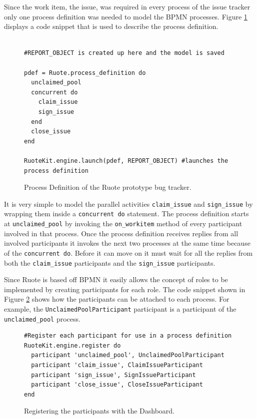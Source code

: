 \documentclass[document.tex]{subfiles}
\begin{document}
Since the work item, the issue, was required in every process of the issue tracker only one process definition was needed to model the BPMN processes. Figure \ref{fig:ruote-prototype-process-definition} displays a code snippet that is used to describe the process definition. 

\begin{figure}[!ht]
  \begin{lstlisting}

#REPORT_OBJECT is created up here and the model is saved

pdef = Ruote.process_definition do
  unclaimed_pool
  concurrent do
    claim_issue
    sign_issue
  end
  close_issue
end

RuoteKit.engine.launch(pdef, REPORT_OBJECT) #launches the process definition

  \end{lstlisting}
  \caption{Process Definition of the Ruote prototype bug tracker.}
  \label{fig:ruote-prototype-process-definition}
\end{figure}

It is very simple to model the parallel activities \verb!claim_issue! and \verb!sign_issue! by wrapping them inside a \verb!concurrent do! statement. The process definition starts at \verb!unclaimed_pool! by invoking the \verb!on_workitem! method of every participant involved in that process. Once the process definition receives replies from all involved participants it invokes the next two processes at the same time because of the \verb!concurrent do!. Before it can move on it must wait for all the replies from both the \verb!claim_issue! participants and the \verb!sign_issue! participants.

Since Ruote is based off BPMN it easily allows the concept of roles to be implemented by creating participants for each role. The code snippet shown in Figure \ref{fig:ruote-prototype-participant-register} shows how the participants can be attached to each process. For example, the \verb!UnclaimedPoolParticipant! participant is a participant of the \verb!unclaimed_pool! process.

\begin{figure}[!ht]
  \begin{lstlisting}
#Register each participant for use in a process definition
RuoteKit.engine.register do
  participant 'unclaimed_pool', UnclaimedPoolParticipant
  participant 'claim_issue', ClaimIssueParticipant
  participant 'sign_issue', SignIssueParticipant
  participant 'close_issue', CloseIssueParticipant
end
  \end{lstlisting}
  \caption{Registering the participants with the Dashboard.}
  \label{fig:ruote-prototype-participant-register}
\end{figure}
\end{document}

